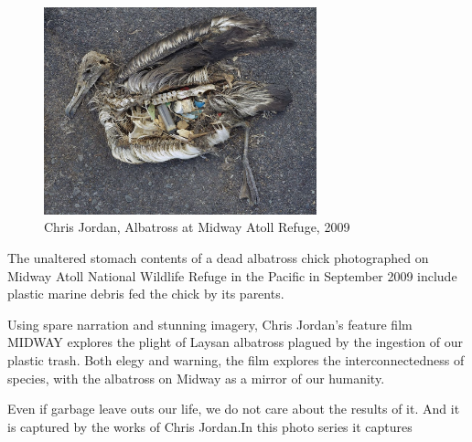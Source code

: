\begin{figure}[h!]
  \centering
  \includegraphics[height=6cm]{graphics/ChrisJordan-Albatross.jpg}
  \caption{Chris Jordan, Albatross at Midway Atoll Refuge, 2009}
  \label{fig:ChrisJordan_Albatross}
\end{figure}

The unaltered stomach contents of a dead albatross chick photographed on Midway Atoll National Wildlife Refuge in the Pacific in September 2009 include plastic marine debris fed the chick by its parents.

Using spare narration and stunning imagery, Chris Jordan's feature film MIDWAY explores the plight of Laysan albatross plagued by the ingestion of our plastic trash. Both elegy and warning, the film explores the interconnectedness of species, with the albatross on Midway as a mirror of our humanity.

Even if garbage leave outs our life, we do not care about the results of it. And it is captured by the works of Chris Jordan.In this photo series it captures 




 \cite{vafin2012zizek}

